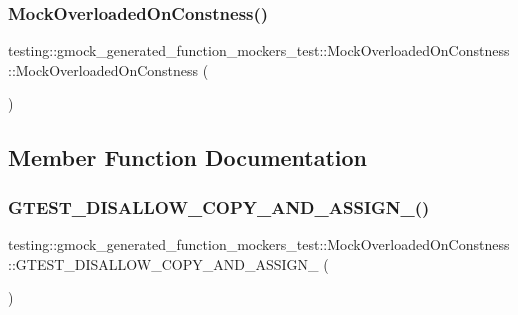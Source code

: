 \subsubsection{\texorpdfstring{MockOverloadedOnConstness()}{MockOverloadedOnConstness()}\hspace{0.1cm}{\footnotesize\ttfamily [3/3]}}
{\footnotesize\ttfamily testing\+::gmock\+\_\+generated\+\_\+function\+\_\+mockers\+\_\+test\+::\+Mock\+Overloaded\+On\+Constness\+::\+Mock\+Overloaded\+On\+Constness (\begin{DoxyParamCaption}{ }\end{DoxyParamCaption})\hspace{0.3cm}{\ttfamily [inline]}}



\subsection{Member Function Documentation}
\mbox{\label{classtesting_1_1gmock__generated__function__mockers__test_1_1_mock_overloaded_on_constness_a9e7d163e79c3878b1205c09cf73582fc}} 
\subsubsection{\texorpdfstring{GTEST\_DISALLOW\_COPY\_AND\_ASSIGN\_()}{GTEST\_DISALLOW\_COPY\_AND\_ASSIGN\_()}\hspace{0.1cm}{\footnotesize\ttfamily [1/3]}}
{\footnotesize\ttfamily testing\+::gmock\+\_\+generated\+\_\+function\+\_\+mockers\+\_\+test\+::\+Mock\+Overloaded\+On\+Constness\+::\+G\+T\+E\+S\+T\+\_\+\+D\+I\+S\+A\+L\+L\+O\+W\+\_\+\+C\+O\+P\+Y\+\_\+\+A\+N\+D\+\_\+\+A\+S\+S\+I\+G\+N\+\_\+ (\begin{DoxyParamCaption}\item[{\mbox{\hyperlink{classtesting_1_1gmock__generated__function__mockers__test_1_1_mock_overloaded_on_constness}{Mock\+Overloaded\+On\+Constness}}}]{ }\end{DoxyParamCaption})\hspace{0.3cm}{\ttfamily [private]}}

